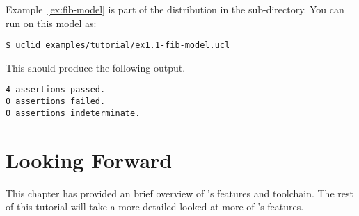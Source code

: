 Example~\ref{ex:fib-model} is part of the \uclid{} distribution in the  sub-directory. You can run \uclid{} on this model as:

\begin{verbatim}
$ uclid examples/tutorial/ex1.1-fib-model.ucl 
\end{verbatim}

This should produce the following output.
\begin{Verbatim}[frame=single, samepage=true]
4 assertions passed.
0 assertions failed.
0 assertions indeterminate.
\end{Verbatim}

\section{Looking Forward}
This chapter has provided an brief overview of \uclid{}'s features and toolchain. The rest of this tutorial will take a more detailed looked at more of \uclid{}'s features.
